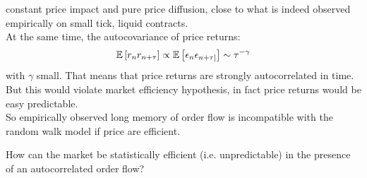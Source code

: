 constant price impact and pure price diffusion, close to what is indeed observed empirically on small tick, liquid contracts.\\
At the same time, the autocovariance of price returns:
\[
\mathbb{E}\left[r_nr_{n + \tau}\right] \propto \mathbb{E}\left[\epsilon_n \epsilon_{n+\tau]}\right]\sim \tau^{-\gamma}
\]
with $\gamma$ small. That means that price returns are strongly autocorrelated in time. But this would violate market efficiency hypothesis, in fact price returns would be easy predictable.\\
So empirically observed long memory of order flow is incompatible with the random walk model if price are efficient.
\begin{myquote}
	How can the market be statistically efficient (i.e. unpredictable) in the presence of an autocorrelated order flow?
\end{myquote}
